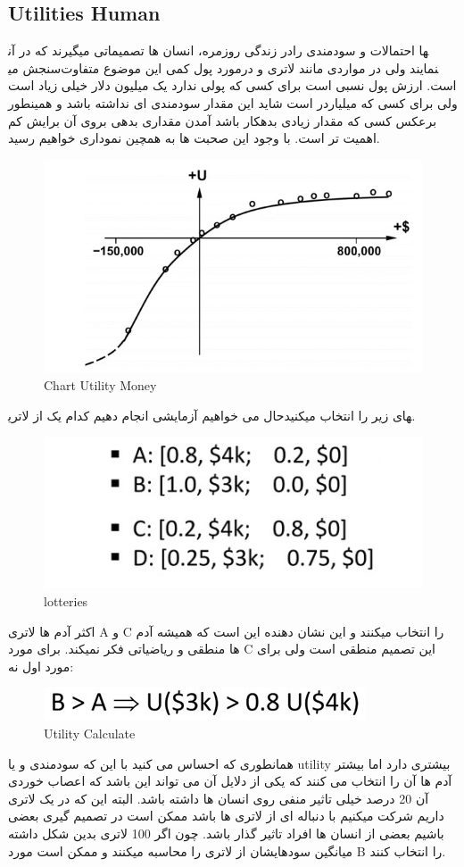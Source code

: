 \subsection{Utilities Human}
در زندگی روزمره، انسان ها تصمیماتی میگیرند که در آن‎ها احتمالات و سودمندی را سنجش می‎نمایند ولی در مواردی مانند لاتری و درمورد پول کمی این موضوع متفاوت است. ارزش پول نسبی است برای کسی که پولی ندارد یک میلیون دلار خیلی زیاد است ولی برای کسی که میلیاردر است شاید این مقدار سودمندی ای نداشته باشد و همینطور برعکس کسی که مقدار زیادی بدهکار باشد آمدن مقداری بدهی بروی آن برایش کم اهمیت تر است. با وجود این صحبت ها به همچین نموداری خواهیم رسید.

\begin{figure}[h!]
    \centering
    \includegraphics[width=0.6\linewidth]{images/moneyUtility.jpg}
    \caption{Chart Utility Money}
\end{figure}


حال می خواهیم آزمایشی انجام دهیم کدام یک از لاتری‎های زیر را انتخاب میکنید.

\begin{figure}[h!]
    \centering
    \includegraphics[width=0.6\linewidth]{images/lottery01.jpg}
    \caption{lotteries}
\end{figure}

اکثر آدم ها لاتری A و  C را انتخاب میکنند و این نشان دهنده این است که همیشه آدم ها منطقی و ریاضیاتی فکر نمیکند. برای مورد  C این تصمیم منطقی است ولی برای مورد اول نه:\

\begin{figure}[h!]
    \centering
    \includegraphics[width=0.6\linewidth]{images/lottery02.jpg}
    \caption{Utility Calculate}
\end{figure}

همانطوری که احساس می کنید با این که سودمندی و یا utility بیشتری دارد اما بیشتر آدم ها آن را انتخاب می کنند که یکی از دلایل آن می تواند این باشد که اعصاب خوردی آن 20 درصد خیلی تاثیر منفی روی انسان ها داشته باشد. البته این که در یک لاتری داریم شرکت میکنیم با دنباله ای از لاتری ها باشد ممکن است در تصمیم گیری بعضی افراد تاثیر گذار باشد. چون اگر 100 لاتری بدین شکل داشته‎ باشیم بعضی از انسان ها میانگین سودهایشان از لاتری را محاسبه میکنند و ممکن است مورد B را انتخاب کنند.